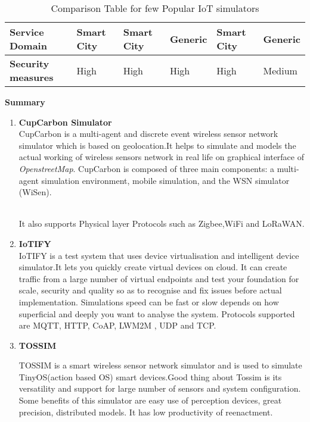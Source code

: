 \documentclass[a4paper,11pt]{article}
\begin{document}
\begin{iotsolution}
\begin{table}[htbp]
{\begin{tabular}{|p{2.7cm}|p{2.5cm}|p{2cm}|p{2.6cm}|p{2.3cm}|p{2.2cm}|}
\textbf{Service Domain}              & Smart City                                                          & Smart City          & Generic               & Smart City        & Generic                                 \\ \hline
\textbf{Security measures}           & High                                                                & High                & High                  & High              & Medium                                  \\ \hline
\end{tabular}
}
\caption{Comparison Table for few Popular IoT simulators}
\end{table}
\clearpage
\centering\large{\textbf{Summary}}
\begin{enumerate}[1]
\item{\textbf{CupCarbon Simulator}}\\


CupCarbon is a multi-agent and discrete event wireless sensor network simulator which is based on geolocation.It helps to simulate and models the actual working of wireless sensors network in real life on graphical interface of \emph{OpenstreetMap}.
CupCarbon is composed
of three main components: a multi-agent simulation environment,
mobile simulation, and the WSN simulator
(WiSen).
  
\\It also supports Physical layer Protocols such as Zigbee,WiFi and LoRaWAN.


\item{\textbf{IoTIFY}}\\
IoTIFY is a test system that uses device virtualisation and intelligent device simulator.It lets you quickly create virtual devices on cloud. It can create traffic from a large number of virtual endpoints and test your foundation for
scale, security and quality so as to recognise and fix issues before actual implementation. Simulations speed can be fast or slow depends on how superficial and deeply you want to analyse the system. Protocols supported are MQTT, HTTP, CoAP, LWM2M , UDP and TCP.

\item{\textbf{TOSSIM}}

TOSSIM is a smart wireless sensor network simulator and is used to simulate TinyOS(action based OS) smart devices.Good thing about Tossim is its versatility and support for large number of sensors and system configuration. Some benefits of this simulator are easy use of perception devices, great precision, distributed models. It has low productivity of reenactment. 


\end{enumerate}
\end{iotsolution}
\end{document}
